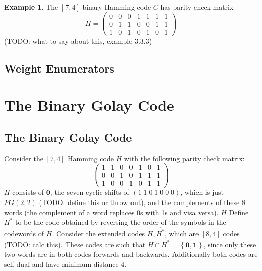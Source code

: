 \documentclass{article}
\newcommand{\ext}[1]{\overline{#1}}
\renewcommand{\=}{\equiv}
\newcommand{\set}[1]{\left\{ #1 \right\}}
\renewcommand{\v}{\mathbf}
\theoremstyle{plain}
\theoremstyle{definition}
\newtheorem{exmp}{Example}[subsection]
\newcommand{\TODO}[1]{(TODO: #1)}
\begin{document}
\begin{exmp}
The $[7,4]$ binary Hamming code $C$ has parity check matrix
$$ H = \begin{pmatrix}
  0 & 0 & 0 & 1 & 1 & 1 & 1 \\
  0 & 1 & 1 & 0 & 0 & 1 & 1 \\
  1 & 0 & 1 & 0 & 1 & 0 & 1
\end{pmatrix} $$
\TODO{what to say about this, example 3.3.3}
\end{exmp}


\subsection{Weight Enumerators}

\section{The Binary Golay Code}


\subsection{The Binary Golay Code}

Consider the $[7,4]$ Hamming code $H$ with the following parity check matrix:
$$ \begin{pmatrix}
  1 & 1 & 0 & 0 & 1 & 0 & 1 \\
  0 & 0 & 1 & 0 & 1 & 1 & 1 \\
  1 & 0 & 0 & 1 & 0 & 1 & 1
\end{pmatrix} $$
$H$ consists of $\v 0$, the seven cyclic shifts of $(1\;1\;0\;1\;0\;0\;0)$, which is just $PG(2,2)$ \TODO{define this or throw out}, and the complements of these 8 words (the complement of a word replaces 0s with 1s and visa versa).
$\ext{H}$
Define $H^*$ to be the code obtained by reversing the order of the symbols in the codewords of $H$.
Consider the extended codes $\ext{H}, \ext{H^*}$, which are $[8,4]$ codes \TODO{calc this}.
These codes are such that $\ext{H} \cap \ext{H^*} = \set{ \v 0, \v 1 }$, since only these two words are in both codes forwards and backwards. Additionally both codes are self-dual and have minimum distance 4.
\end{document}
